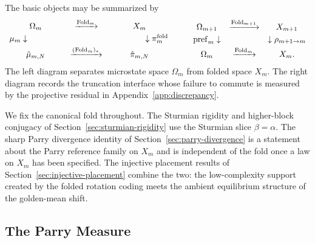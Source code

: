 \begin{remark}\label{rem:model-spaces-maps}
The basic objects may be summarized by
\[
\begin{array}{ccc}
\Omega_m & \xrightarrow{\Fold_m} & X_m\\[0.3em]
\mu_m \downarrow\phantom{(\Fold_m)_*} &  & \phantom{(\Fold_m)_*}\downarrow \pi_m^{\mathrm{fold}}\\[0.3em]
\hat\mu_{m,N} & \xrightarrow{(\Fold_m)_*} & \hat\pi_{m,N}
\end{array}
\qquad
\begin{array}{ccc}
\Omega_{m+1} & \xrightarrow{\Fold_{m+1}} & X_{m+1}\\[0.3em]
\pref_m \downarrow &  & \downarrow \rho_{m+1\to m}\\[0.3em]
\Omega_m & \xrightarrow{\Fold_m} & X_m.
\end{array}
\]
The left diagram separates microstate space \(\Omega_m\) from folded space
\(X_m\). The right diagram records the truncation interface whose failure to
commute is measured by the projective residual in
Appendix~\ref{app:discrepancy}.
\end{remark}

\begin{remark}[Scope]\label{rem:scope-fold-assumptions}
We fix the canonical fold throughout. The Sturmian rigidity and higher-block
conjugacy of Section~\ref{sec:sturmian-rigidity} use the Sturmian slice
$\beta=\alpha$. The sharp Parry divergence identity of
Section~\ref{sec:parry-divergence} is a statement about the Parry reference
family on $X_m$ and is independent of the fold once a law on $X_m$ has been
specified. The injective placement results of
Section~\ref{sec:injective-placement} combine the two: the low-complexity
support created by the folded rotation coding meets the ambient equilibrium
structure of the golden-mean shift.
\end{remark}

\subsection{The Parry Measure}


